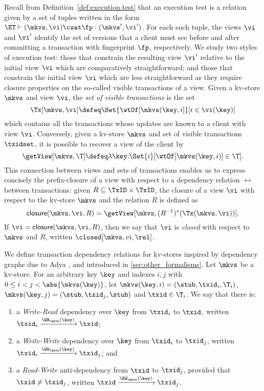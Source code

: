 Recall from Definition~\ref{def:execution.test} that an execution test is a relation
given by a set of tuples written in the form
$\ET \vdash (\mkvs,\vi) \csat \fp: (\mkvs', \vi')$. 
For each such tuple, the views $\vi$ and $\vi'$ identify the set 
of versions that a client must see before and after committing a transaction 
with fingerprint $\fp$, respectively.
We study 
two styles of execution test: those that constrain the resulting view
$\vi'$ relative to the initial view $\vi$ which are comparatively straightforward; and those that constrain the initial view $\vi$ which
are less straightforward as they require closure properties on the
so-called visible transactions of a view. 
Given a kv-store $\mkvs$ and view $\vi$, the {\em set of visible
  transactions} is the set 
 \[
\Tx[\mkvs, \vi] \defeq
\Set{\wtOf[\mkvs(\key, i] }[ i \in \vi(\key)]
\]
which contains all the transactions whose updates are known to a
client with view $\vi$.  Conversely, given a kv-store $\mkvs$ and set
of visible transactions $\txidset$, it is possible to recover a view
of the client by
\[
\getView[\mkvs, \T] \defeq \lambda \key. \Set{i }[
\wtOf[\mkvs(\key, i)] \in \T].
\]
This connection between views and sets of transactions enables us to express concisely 
the prefix-closure of a view with respect to a dependency relation $\rel$ between 
transactions: given $R \subseteq \TxID \times \TxID$, the closure of 
a view $\vi$ with respect to the kv-store $\mkvs$ and the relation $R$
is defined as 
\[
\mathsf{closure}(\mkvs, \vi, R)
= \getView[\mkvs, (R^{-1})^{\ast}(\Tx(\mkvs, \vi))].
\]
If $\vi = \mathsf{closure}(\mkvs, \vi, R)$, then we say that $\vi$ is \emph{closed} with 
respect to $\mkvs$ and $R$, written \( \closed[\mkvs,vi,\rel]\).


We define transaction dependency
relations for kv-stores inspired by dependency graphs due to Adya \cite{adya}, and 
introduced in \ref{sec:other_formalisms}.
Let $\mkvs$ be a kv-store. For an arbitrary key $\key$ and 
indexes $i,j$ with  $0 \leq i < j < \abs{ \mkvs(\key) }$, let 
$\mkvs(\key, i)  = (\stub, \txid_{i}, \T_{i})$, $\mkvs(\key,j)  =
(\stub, \txid_{j}, \stub) $
and $\txid \in \T_{i}$. We say that there is:
\begin{enumerate} 
\item a \emph{Write-Read} dependency over 
$\key$ from $\txid_{i}$ to $\txid$, written $\txid_{i} \xrightarrow{\WR_{\mkvs}(\key)} \txid$;
\item a \emph{Write-Write} dependency over $\key$ from $\txid_{i}$ to $\txid_{j}$, 
written $\txid_{i} \xrightarrow{\WW_{\mkvs}(\key)} \txid_{j}$; and 
\item a \emph{Read-Write} anti-dependency from $\txid$ to $\txid_{j}$, provided that 
$\txid \neq \txid_{j}$, written $\txid \xrightarrow{\RW_{\mkvs}(\key)} \txid_{j}$.
\end{enumerate}


